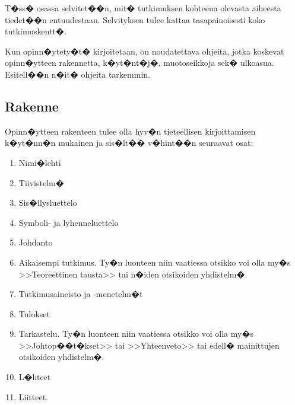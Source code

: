 \documentclass[finnish,12pt,a4paper,pdftex]{article}
\begin{document}
T�ss� osassa selvitet��n, mit� tutkimuksen kohteena olevasta
aiheesta tiedet��n entuudestaan. Selvityksen tulee kattaa
tasapainoisesti koko tutkimuskentt�. 

Kun opinn�ytety�t� kirjoitetaan, on noudatettava 
ohjeita, jotka koskevat opinn�ytteen rakennetta,
k�yt�nt�j�, muotoseikkoja sek� ulkoasua. Esitell��n n�it�
ohjeita tarkemmin.


\subsection*{Rakenne}

Opinn�ytteen rakenteen tulee olla hyv�n tieteellisen
kirjoittamisen k�yt�nn�n mukainen ja sis�lt�� v�hint��n seuraavat
osat:

\begin{enumerate}
\item Nimi�lehti
\item Tiivistelm�
\item Sis�llysluettelo
\item Symboli- ja lyhenneluettelo
\item \label{a} Johdanto
\item  Aikaisempi tutkimus. Ty�n luonteen niin vaatiessa otsikko voi olla my�s
        >>Teoreettinen tausta>>  tai n�iden otsikoiden yhdistelm�.
\item Tutkimusaineisto ja -menetelm�t %
\item Tulokset
\item \label{o} Tarkastelu. Ty�n luonteen niin vaatiessa otsikko voi
      olla my�s >>Johtop��t�kset>> tai >>Yhteenveto>> 
      tai edell� mainittujen otsikoiden yhdistelm�.
\item L�hteet
\item Liitteet.
\end{enumerate}
\end{document}
